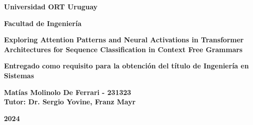 \vspace*{\fill}

\begin{center}

\begin{Large}
\textbf{Universidad ORT Uruguay}

\textbf{Facultad de Ingeniería}
\bigskip\bigskip\bigskip\bigskip\bigskip\bigskip
\end{Large}

\begin{Huge}

\textbf{Exploring Attention Patterns and Neural Activations in Transformer Architectures for Sequence Classification in Context Free Grammars}%
\end{Huge}    
\bigskip\bigskip\bigskip\bigskip\bigskip\bigskip


\begin{Large}
\textbf{Entregado como requisito para la obtención del título de Ingeniería en Sistemas}%
\end{Large}


\bigskip\bigskip\bigskip\bigskip\bigskip\bigskip\bigskip\bigskip

\begin{Large}
\textbf{Matías Molinolo De Ferrari - 231323} \\%

\bigskip
\bigskip
\bigskip
\textbf{Tutor: Dr. Sergio Yovine, Franz Mayr}%

\bigskip\bigskip\bigskip\bigskip
\end{Large}

\begin{Huge}
\textbf{2024}%
\end{Huge}

\end{center}
\vspace*{\fill}